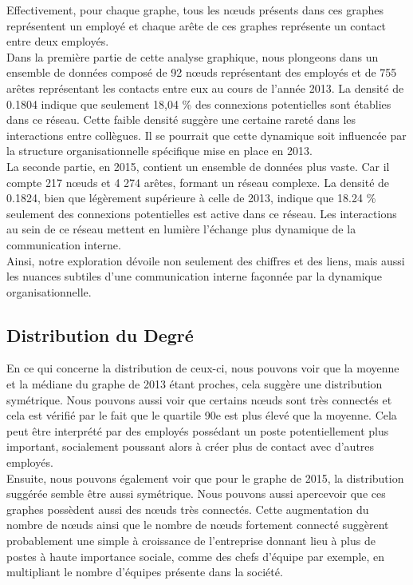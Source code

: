 \documentclass{article}
\begin{document}
Effectivement, pour chaque graphe, tous les nœuds présents dans ces graphes représentent un employé et chaque arête de ces graphes représente un contact entre deux employés. \\

Dans la première partie de cette analyse graphique, nous plongeons dans un ensemble de données composé de 92 nœuds représentant des employés et de 755 arêtes représentant les contacts entre eux au cours de l'année 2013. La densité de 0.1804 indique que seulement 18,04 \% des connexions potentielles sont établies dans ce réseau. Cette faible densité suggère une certaine rareté dans les interactions entre collègues. Il se pourrait que cette dynamique soit influencée par la structure organisationnelle spécifique mise en place en 2013. \\

La seconde partie, en 2015, contient un ensemble de données plus vaste. Car il compte 217 nœuds et 4 274 arêtes, formant un réseau complexe. La densité de 0.1824, bien que légèrement supérieure à celle de 2013, indique que 18.24 \% seulement des connexions potentielles est active dans ce réseau. Les interactions au sein de ce réseau mettent en lumière l’échange plus dynamique de la communication interne. \\

Ainsi, notre exploration dévoile non seulement des chiffres et des liens, mais aussi les nuances subtiles d'une communication interne façonnée par la dynamique organisationnelle.

\subsection{Distribution du Degré}

En ce qui concerne la distribution de ceux-ci, nous pouvons voir que la moyenne et la médiane du graphe de 2013 étant proches, cela suggère une distribution symétrique.
Nous pouvons aussi voir que certains nœuds sont très connectés et cela est vérifié par le fait que le quartile 90e est plus élevé que la moyenne. Cela peut être interprété par des employés possédant un poste potentiellement plus important, socialement poussant alors à créer plus de contact avec d’autres employés. \\

Ensuite, nous pouvons également voir que pour le graphe de 2015, la distribution suggérée semble être aussi symétrique. Nous pouvons aussi apercevoir que ces graphes possèdent aussi des nœuds très connectés. Cette augmentation du nombre de nœuds ainsi que le nombre de nœuds fortement connecté suggèrent probablement une simple à croissance de l’entreprise donnant lieu à plus de postes à haute importance sociale, comme des chefs d’équipe par exemple, en multipliant le nombre d’équipes présente dans la société.
\end{document}

